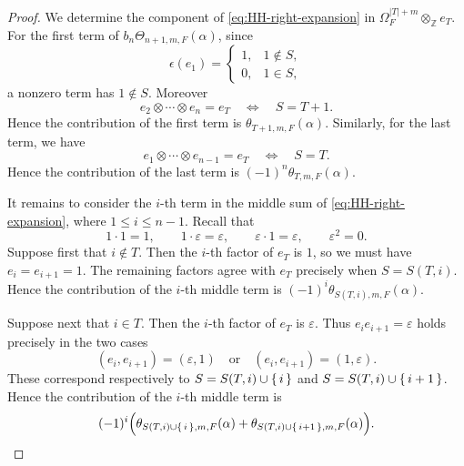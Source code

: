 \documentclass[a4paper,12pt,reqno]{amsart}
\numberwithin{equation}{section}
\theoremstyle{definition}
\newcommand{\Z}{\mathbb{Z}}
\begin{document}
\begin{proof}
We determine the component of \eqref{eq:HH-right-expansion} in
$\Omega_F^{|T|+m}\otimes_{\Z}e_T$.
For the first term of $b_n\Theta_{n+1,m,F}(\alpha)$, 
since 
\[
 \epsilon(e_1)=
 \begin{cases}
 1,&1\notin S,\\
 0,&1\in S,
 \end{cases}
\]
a nonzero term has $1\notin S$. 
Moreover 
\[
 e_2\otimes\cdots\otimes e_n=e_T
 \quad\Longleftrightarrow\quad
 S=T+1.
\]
Hence the contribution of the first term is
$ \theta_{T+1,m,F}(\alpha)$.
Similarly, for the last term, we have
\[
 e_1\otimes\cdots\otimes e_{n-1}=e_T
 \quad\Longleftrightarrow\quad
 S=T.
\]
Hence the contribution of the last term is
$(-1)^n\theta_{T,m,F}(\alpha)$. 

It remains to consider the $i$-th term in the middle sum of
\eqref{eq:HH-right-expansion}, where $1\leq i\leq n-1$.
Recall that
\[
 1\cdot1=1,\qquad
 1\cdot\varepsilon=\varepsilon,\qquad
 \varepsilon\cdot1=\varepsilon,\qquad
 \varepsilon^2=0.
\]
Suppose first that $i\notin T$.  Then the $i$-th factor of $e_T$ is
$1$, so we must have
$ e_i=e_{i+1}=1$. 
The remaining factors agree with $e_T$ precisely when $S=S(T,i)$.
Hence the contribution of the $i$-th middle term is
$(-1)^i\theta_{S(T,i),m,F}(\alpha)$. 

Suppose next that $i\in T$.  Then the $i$-th factor of $e_T$ is
$\varepsilon$.  
Thus $ e_i e_{i+1}=\varepsilon$ holds precisely in the two cases
\[
 (e_i,e_{i+1})=(\varepsilon,1)
 \quad\mbox{or}\quad
 (e_i,e_{i+1})=(1,\varepsilon).
\]
These correspond respectively to
$S=S(T,i)\cup\set{i}$ and $S=S(T,i)\cup\set{i+1}$.
Hence the contribution of the $i$-th middle term is
\[
 (-1)^i
 \Bigl(
 \theta_{S(T,i)\cup\set{i},m,F}(\alpha)
 +
 \theta_{S(T,i)\cup\set{i+1},m,F}(\alpha)
 \Bigr).
\]


\end{proof}
\end{document}

